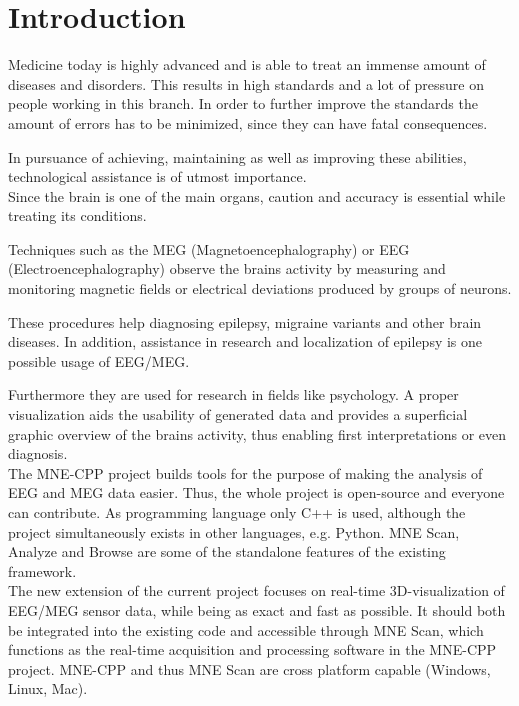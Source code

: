 
\section{Introduction}

	Medicine today is highly advanced and is able to treat an immense amount of diseases and disorders.
	This results in high standards and a lot of pressure on people working in this branch. In order to further improve the 			standards the amount of errors has to be minimized, since they can have fatal consequences. %

	In pursuance of achieving, maintaining as well as improving these abilities, technological assistance is of utmost 				importance.\\  

	Since the brain is one of the main organs, caution and accuracy is essential while treating its conditions. 
	
	Techniques such as the MEG (Magnetoencephalography) or EEG (Electroencephalography) observe the brains activity by 				measuring and monitoring magnetic fields or electrical deviations produced by groups of neurons.

	These procedures help diagnosing epilepsy, migraine variants and other brain diseases. In addition, assistance in 				research and localization of epilepsy is one possible usage of EEG/MEG. 
	 
	Furthermore they are used for research in fields like psychology.
	A proper visualization aids the usability of generated data and provides a superficial graphic overview of the brains 			activity, thus enabling first interpretations or even diagnosis.\\
	

	The MNE-CPP  project builds tools for the purpose of making the analysis of EEG and MEG data easier.
	Thus, the whole project is open-source and everyone can contribute. As programming language only C++ is used, although the 	project simultaneously exists in other languages, e.g. Python. 
	MNE Scan, Analyze and Browse are some of the standalone features of the existing framework. \\

	The new extension of the current project focuses on real-time 3D-visualization of EEG/MEG sensor data, while being as 			exact and fast as possible. It should both be integrated into the existing code and accessible through MNE Scan, which 			functions as the real-time acquisition and processing software in the MNE-CPP project. MNE-CPP and thus MNE Scan are cross 	platform capable (Windows, Linux, Mac). 
  
